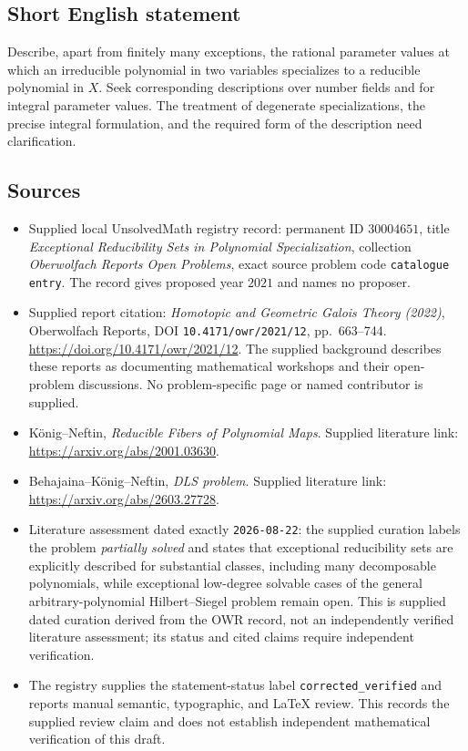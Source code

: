 \documentclass[11pt]{article}
\begin{document}
\subsection{Short English statement}
Describe, apart from finitely many exceptions, the rational parameter values at which an irreducible polynomial in two variables specializes to a reducible polynomial in \(X\). Seek corresponding descriptions over number fields and for integral parameter values. The treatment of degenerate specializations, the precise integral formulation, and the required form of the description need clarification.
\subsection{Sources}
\begin{itemize}
\item Supplied local UnsolvedMath registry record: permanent ID \(30004651\), title \emph{Exceptional Reducibility Sets in Polynomial Specialization}, collection \emph{Oberwolfach Reports Open Problems}, exact source problem code \texttt{catalogue entry}. The record gives proposed year \(2021\) and names no proposer.
\item Supplied report citation: \emph{Homotopic and Geometric Galois Theory (2022)}, Oberwolfach Reports, DOI \texttt{10.4171/owr/2021/12}, pp.~663--744. \url{https://doi.org/10.4171/owr/2021/12}. The supplied background describes these reports as documenting mathematical workshops and their open-problem discussions. No problem-specific page or named contributor is supplied.
\item K\"onig--Neftin, \emph{Reducible Fibers of Polynomial Maps}. Supplied literature link: \url{https://arxiv.org/abs/2001.03630}.
\item Behajaina--K\"onig--Neftin, \emph{DLS problem}. Supplied literature link: \url{https://arxiv.org/abs/2603.27728}.
\item Literature assessment dated exactly \texttt{2026-08-22}: the supplied curation labels the problem \emph{partially solved} and states that exceptional reducibility sets are explicitly described for substantial classes, including many decomposable polynomials, while exceptional low-degree solvable cases of the general arbitrary-polynomial Hilbert--Siegel problem remain open. This is supplied dated curation derived from the OWR record, not an independently verified literature assessment; its status and cited claims require independent verification.
\item The registry supplies the statement-status label \texttt{corrected\_verified} and reports manual semantic, typographic, and LaTeX review. This records the supplied review claim and does not establish independent mathematical verification of this draft.
\end{itemize}
\end{document}
